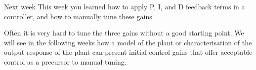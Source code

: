 \documentclass[9pt]{beamer-control}
\begin{document}
\begin{frame}{Next week}
  This week you learned how to apply P, I, and D feedback terms in a controller, and how to manually tune these gains.

  Often it is very hard to tune the three gains without a good starting point. We will see in the following weeks how a model of the plant or characterisation of the output response of the plant can present initial control gains that offer acceptable control as a precursor to manual tuning.
\end{frame}
\end{document}
